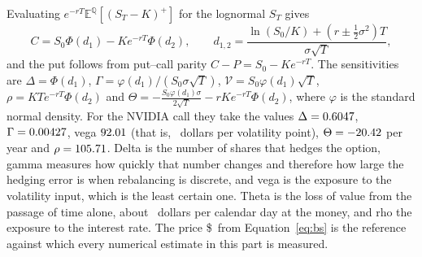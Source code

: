Evaluating $e^{-rT}\mathbb E^{\mathbb Q}[(S_T-K)^+]$ for the lognormal $S_T$ gives
\begin{equation}\label{eq:bs}
 C=S_0\Phi(d_1)-Ke^{-rT}\Phi(d_2),\qquad d_{1,2}=\frac{\ln(S_0/K)+(r\pm\frac12\sigma^2)T}{\sigma\sqrt T},
\end{equation}
and the put follows from put--call parity $C-P=S_0-Ke^{-rT}$.
The sensitivities are $\Delta=\Phi(d_1)$, $\Gamma=\varphi(d_1)/(S_0\sigma\sqrt T)$, $\mathcal V=S_0\varphi(d_1)\sqrt T$, $\rho=KTe^{-rT}\Phi(d_2)$ and $\Theta=-\frac{S_0\varphi(d_1)\sigma}{2\sqrt T}-rKe^{-rT}\Phi(d_2)$, where $\varphi$ is the standard normal density.
For the NVIDIA call they take the values $\Delta=0.6047$, $\Gamma=0.00427$, vega $92.01$ (that is, \BSvegaPct\ dollars per volatility point), $\Theta=-20.42$ per year and $\rho=105.71$.
Delta is the number of shares that hedges the option, gamma measures how quickly that number changes and therefore how large the hedging error is when rebalancing is discrete, and vega is the exposure to the volatility input, which is the least certain one.
Theta is the loss of value from the passage of time alone, about \BSthetaDay\ dollars per calendar day at the money, and rho the exposure to the interest rate.
The price \$\BSprice\ from Equation~\eqref{eq:bs} is the reference against which every numerical estimate in this part is measured.
